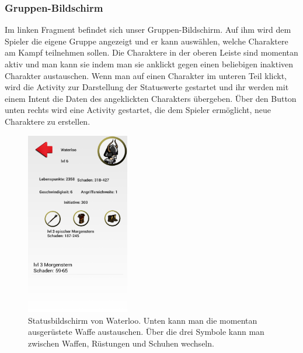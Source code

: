 \documentclass[extern,palatino]{cgBA}
\begin{document}
\subsubsection{Gruppen-Bildschirm}
Im linken Fragment befindet sich unser Gruppen-Bildschirm. Auf ihm wird dem Spieler die eigene Gruppe angezeigt und er kann auswählen, welche Charaktere am Kampf teilnehmen sollen. Die Charaktere in der oberen Leiste sind momentan aktiv und man kann sie indem man sie anklickt gegen einen beliebigen inaktiven Charakter austauschen.
Wenn man auf einen Charakter im unteren Teil klickt, wird die Activity zur Darstellung der Statuswerte gestartet und ihr werden mit einem Intent die Daten des angeklickten Charakters übergeben. Über den Button unten rechts wird eine Activity gestartet, die dem Spieler ermöglicht, neue Charaktere zu erstellen.
\newpage
\begin{figure}[H] 
		\centering
		\includegraphics[width=0.4\textwidth]{statscreen.png}
		\caption{Statusbildschirm von Waterloo. Unten kann man die momentan ausgerüstete Waffe austauschen. Über die drei Symbole kann man zwischen Waffen, Rüstungen und Schuhen wechseln.}
		\label{fig:Bild4}
\end{figure} 
\end{document}
